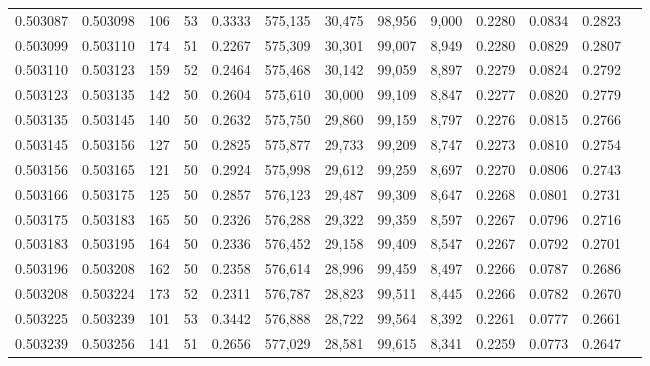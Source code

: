 \begin{tabular}{rrrrrrrrrrrrr}
0.503087 & 0.503098 & 106 &  53 &                                     0.3333 & 575,135 &  30,475 &  98,956 &   9,000 & 0.2280 & 0.0834 & 0.2823 \\
0.503099 & 0.503110 & 174 &  51 &                                     0.2267 & 575,309 &  30,301 &  99,007 &   8,949 & 0.2280 & 0.0829 & 0.2807 \\
0.503110 & 0.503123 & 159 &  52 &                                     0.2464 & 575,468 &  30,142 &  99,059 &   8,897 & 0.2279 & 0.0824 & 0.2792 \\
0.503123 & 0.503135 & 142 &  50 &                                     0.2604 & 575,610 &  30,000 &  99,109 &   8,847 & 0.2277 & 0.0820 & 0.2779 \\
0.503135 & 0.503145 & 140 &  50 &                                     0.2632 & 575,750 &  29,860 &  99,159 &   8,797 & 0.2276 & 0.0815 & 0.2766 \\
0.503145 & 0.503156 & 127 &  50 &                                     0.2825 & 575,877 &  29,733 &  99,209 &   8,747 & 0.2273 & 0.0810 & 0.2754 \\
0.503156 & 0.503165 & 121 &  50 &                                     0.2924 & 575,998 &  29,612 &  99,259 &   8,697 & 0.2270 & 0.0806 & 0.2743 \\
0.503166 & 0.503175 & 125 &  50 &                                     0.2857 & 576,123 &  29,487 &  99,309 &   8,647 & 0.2268 & 0.0801 & 0.2731 \\
0.503175 & 0.503183 & 165 &  50 &                                     0.2326 & 576,288 &  29,322 &  99,359 &   8,597 & 0.2267 & 0.0796 & 0.2716 \\
0.503183 & 0.503195 & 164 &  50 &                                     0.2336 & 576,452 &  29,158 &  99,409 &   8,547 & 0.2267 & 0.0792 & 0.2701 \\
0.503196 & 0.503208 & 162 &  50 &                                     0.2358 & 576,614 &  28,996 &  99,459 &   8,497 & 0.2266 & 0.0787 & 0.2686 \\
0.503208 & 0.503224 & 173 &  52 &                                     0.2311 & 576,787 &  28,823 &  99,511 &   8,445 & 0.2266 & 0.0782 & 0.2670 \\
0.503225 & 0.503239 & 101 &  53 &                                     0.3442 & 576,888 &  28,722 &  99,564 &   8,392 & 0.2261 & 0.0777 & 0.2661 \\
0.503239 & 0.503256 & 141 &  51 &                                     0.2656 & 577,029 &  28,581 &  99,615 &   8,341 & 0.2259 & 0.0773 & 0.2647 \\

\end{tabular}
